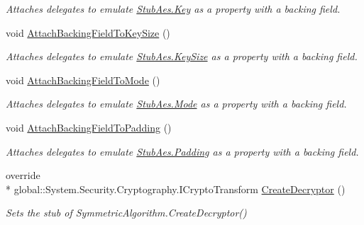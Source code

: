 \begin{DoxyCompactItemize}
\begin{DoxyCompactList}\small\item\em Attaches delegates to emulate \hyperlink{class_system_1_1_security_1_1_cryptography_1_1_fakes_1_1_stub_aes_a43ec6f63fb564f3a457371ad89427b70}{Stub\-Aes.\-Key} as a property with a backing field.\end{DoxyCompactList}\item 
void \hyperlink{class_system_1_1_security_1_1_cryptography_1_1_fakes_1_1_stub_aes_a338cbdb3f7124f2338ffd41fb74db196}{Attach\-Backing\-Field\-To\-Key\-Size} ()
\begin{DoxyCompactList}\small\item\em Attaches delegates to emulate \hyperlink{class_system_1_1_security_1_1_cryptography_1_1_fakes_1_1_stub_aes_a5f745d4ccdbc0be88293aade6b3b1b3a}{Stub\-Aes.\-Key\-Size} as a property with a backing field.\end{DoxyCompactList}\item 
void \hyperlink{class_system_1_1_security_1_1_cryptography_1_1_fakes_1_1_stub_aes_a5cdc61418e0f1a48a3599f150ce09f67}{Attach\-Backing\-Field\-To\-Mode} ()
\begin{DoxyCompactList}\small\item\em Attaches delegates to emulate \hyperlink{class_system_1_1_security_1_1_cryptography_1_1_fakes_1_1_stub_aes_aa5bcc8ff6f93ba83585ef23b4ba1237a}{Stub\-Aes.\-Mode} as a property with a backing field.\end{DoxyCompactList}\item 
void \hyperlink{class_system_1_1_security_1_1_cryptography_1_1_fakes_1_1_stub_aes_aba548360cee58be4f5c18f0437042699}{Attach\-Backing\-Field\-To\-Padding} ()
\begin{DoxyCompactList}\small\item\em Attaches delegates to emulate \hyperlink{class_system_1_1_security_1_1_cryptography_1_1_fakes_1_1_stub_aes_aa4970b2cf10f78e32b4640c28f754147}{Stub\-Aes.\-Padding} as a property with a backing field.\end{DoxyCompactList}\item 
override \\*
global\-::\-System.\-Security.\-Cryptography.\-I\-Crypto\-Transform \hyperlink{class_system_1_1_security_1_1_cryptography_1_1_fakes_1_1_stub_aes_a2c0d84b95faaf150eb7346a44cf97cdf}{Create\-Decryptor} ()
\begin{DoxyCompactList}\small\item\em Sets the stub of Symmetric\-Algorithm.\-Create\-Decryptor()\end{DoxyCompactList}\item 

\end{DoxyCompactItemize}
